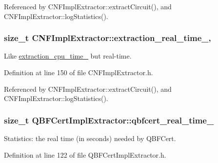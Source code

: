 Referenced by C\-N\-F\-Impl\-Extractor\-::extract\-Circuit(), and C\-N\-F\-Impl\-Extractor\-::log\-Statistics().

\hypertarget{classCNFImplExtractor_ae06413cf08f868357d64545b3041aa18}{
\subsubsection[{extraction\-\_\-real\-\_\-time\-\_\-}]{\setlength{\rightskip}{0pt plus 5cm}size\-\_\-t C\-N\-F\-Impl\-Extractor\-::extraction\-\_\-real\-\_\-time\-\_\-\hspace{0.3cm}{\ttfamily [protected]}, {\ttfamily [inherited]}}}\label{classCNFImplExtractor_ae06413cf08f868357d64545b3041aa18}


Like \hyperlink{classCNFImplExtractor_ab8be06d42fd3c4b569ec22cfcf2f508e}{extraction\-\_\-cpu\-\_\-time\-\_\-} but real-\/time. 



Definition at line 150 of file C\-N\-F\-Impl\-Extractor.\-h.



Referenced by C\-N\-F\-Impl\-Extractor\-::extract\-Circuit(), and C\-N\-F\-Impl\-Extractor\-::log\-Statistics().

\hypertarget{classQBFCertImplExtractor_ab596205af9db44f69af214adca44201c}{
\subsubsection[{qbfcert\-\_\-real\-\_\-time\-\_\-}]{\setlength{\rightskip}{0pt plus 5cm}size\-\_\-t Q\-B\-F\-Cert\-Impl\-Extractor\-::qbfcert\-\_\-real\-\_\-time\-\_\-\hspace{0.3cm}{\ttfamily [protected]}}}\label{classQBFCertImplExtractor_ab596205af9db44f69af214adca44201c}


Statistics\-: the real time (in seconds) needed by Q\-B\-F\-Cert. 



Definition at line 122 of file Q\-B\-F\-Cert\-Impl\-Extractor.\-h.



